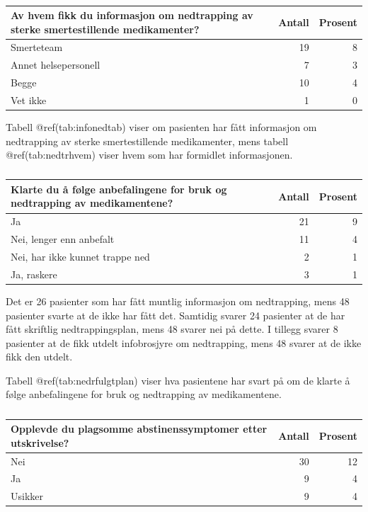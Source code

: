 \documentclass[
]{article}
\begin{document}
\begin{table}

\caption{\label{tab:nedtrhvem}}
\centering
\begin{tabular}[t]{l|r|r}
\hline
Av hvem fikk du informasjon om nedtrapping av sterke smertestillende medikamenter? & Antall  & Prosent\\
\hline
Smerteteam & 19 & 8\\
\hline
Annet helsepersonell & 7 & 3\\
\hline
Begge & 10 & 4\\
\hline
Vet ikke & 1 & 0\\
\hline
\end{tabular}
\end{table}

Tabell @ref(tab:infonedtab) viser om pasienten har fått informasjon om
nedtrapping av sterke smertestillende medikamenter, mens tabell
@ref(tab:nedtrhvem) viser hvem som har formidlet informasjonen.

\begin{table}

\caption{\label{tab:nedrfulgtplan}}
\centering
\begin{tabular}[t]{l|r|r}
\hline
Klarte du å følge anbefalingene for bruk og nedtrapping av medikamentene? & Antall  & Prosent\\
\hline
Ja & 21 & 9\\
\hline
Nei, lenger enn anbefalt & 11 & 4\\
\hline
Nei, har ikke kunnet trappe ned & 2 & 1\\
\hline
Ja, raskere & 3 & 1\\
\hline
\end{tabular}
\end{table}

Det er 26 pasienter som har fått muntlig informasjon om nedtrapping,
mens 48 pasienter svarte at de ikke har fått det. Samtidig svarer 24
pasienter at de har fått skriftlig nedtrappingsplan, mens 48 svarer nei
på dette. I tillegg svarer 8 pasienter at de fikk utdelt infobrosjyre om
nedtrapping, mens 48 svarer at de ikke fikk den utdelt.

Tabell @ref(tab:nedrfulgtplan) viser hva pasientene har svart på om de
klarte å følge anbefalingene for bruk og nedtrapping av medikamentene.

\begin{table}

\caption{\label{tab:abstietter}}
\centering
\begin{tabular}[t]{l|r|r}
\hline
Opplevde du plagsomme abstinenssymptomer etter utskrivelse? & Antall  & Prosent\\
\hline
Nei & 30 & 12\\
\hline
Ja & 9 & 4\\
\hline
Usikker & 9 & 4\\
\hline
\end{tabular}
\end{table}
\end{document}

